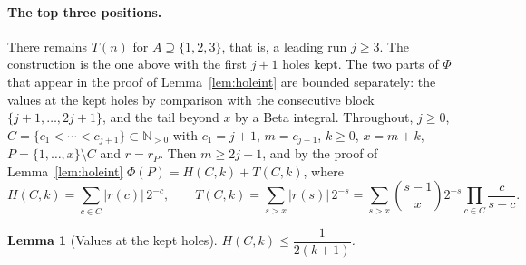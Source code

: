 \documentclass[11pt]{article}
\newtheorem{lemma}[theorem]{Lemma}
\newcommand{\N}{\mathbb N}
\begin{document}
\paragraph{The top three positions.}
There remains $T(n)$ for $A\supseteq\{1,2,3\}$, that is, a leading run
$j\ge3$.  The construction is the one above with the first $j+1$ holes kept.
The two parts of $\Phi$ that appear in the proof of Lemma~\ref{lem:holeint}
are bounded separately: the values at the kept holes by comparison with the
consecutive block $\{j+1,\ldots,2j+1\}$, and the tail beyond $x$ by a Beta
integral.  Throughout, $j\ge0$, $C=\{c_1<\cdots<c_{j+1}\}\subset\N_{>0}$ with
$c_1=j+1$, $m=c_{j+1}$, $k\ge0$, $x=m+k$, $P=\{1,\ldots,x\}\setminus C$ and
$r=r_P$.  Then $m\ge2j+1$, and by the proof of Lemma~\ref{lem:holeint}
$\Phi(P)=H(C,k)+T(C,k)$, where
\[
  H(C,k)=\sum_{c\in C}|r(c)|\,2^{-c},\qquad
  T(C,k)=\sum_{s>x}|r(s)|\,2^{-s}
        =\sum_{s>x}\binom{s-1}x2^{-s}\prod_{c\in C}\frac c{s-c}.
\]

\begin{lemma}[Values at the kept holes]\label{lem:holevals}
$H(C,k)\le\dfrac1{2(k+1)}$.
\end{lemma}
\end{document}
